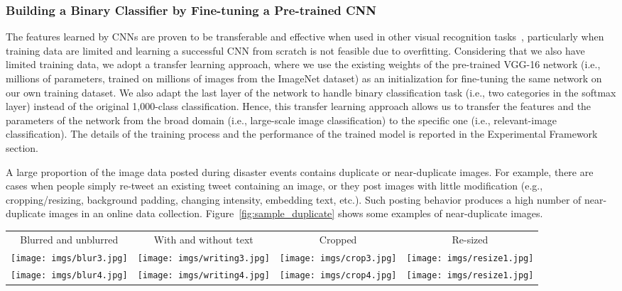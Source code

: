 \documentclass{iscram}
\begin{document}
\subsubsection{Building a Binary Classifier by Fine-tuning a Pre-trained CNN}
The features learned by CNNs are proven to be transferable and effective when used in other visual recognition tasks~\parencite{yosinski2014transferable,ozbulak2016transferable}, particularly when training data are limited and learning a successful CNN from scratch is not feasible due to overfitting. Considering that we also have limited training data, we adopt a transfer learning approach, where we use the existing weights of the pre-trained VGG-16 network (i.e., millions of parameters, trained on millions of images from the ImageNet dataset) as an initialization for fine-tuning the same network on our own training dataset. We also adapt the last layer of the network to handle binary classification task (i.e., two categories in the softmax layer) instead of the original 1,000-class classification. Hence, this transfer learning approach allows us to transfer the features and the parameters of the network from the broad domain (i.e., large-scale image classification) to the specific one (i.e., relevant-image classification). The details of the training process and the performance of the trained model is reported in the Experimental Framework section.

A large proportion of the image data posted during disaster events contains duplicate or near-duplicate images. For example, there are cases when people simply re-tweet an existing tweet containing an image, or they post images with little modification (e.g., cropping/resizing, background padding, changing intensity, embedding text, etc.). Such posting behavior produces a high number of near-duplicate images in an online data collection. Figure~\ref{fig:sample_duplicate} shows some examples of near-duplicate images.

\begin{figure*}[ht!]
\centering
\begin{tabular}{c c c c }
  		Blurred and unblurred & With and without text & Cropped  & Re-sized  \\
\texttt{[image: imgs/blur3.jpg]} 
&\texttt{[image: imgs/writing3.jpg]}
&\texttt{[image: imgs/crop3.jpg]}
&\texttt{[image: imgs/resize1.jpg]}\\
\texttt{[image: imgs/blur4.jpg]} 
&\texttt{[image: imgs/writing4.jpg]}
&\texttt{[image: imgs/crop4.jpg]}
&\texttt{[image: imgs/resize1.jpg]}\\
\end{tabular}
\caption{Examples of near-duplicate images found in our datasets.}
\label{fig:sample_duplicate}
\end{figure*}
\end{document}
